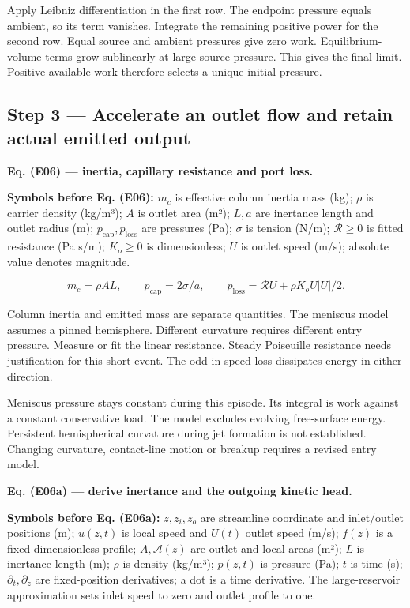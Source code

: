 \documentclass[11pt]{article}
\begin{document}
Apply Leibniz differentiation in the first row. The endpoint pressure equals ambient, so its term vanishes. Integrate the remaining positive power for the second row. Equal source and ambient pressures give zero work. Equilibrium-volume terms grow sublinearly at large source pressure. This gives the final limit. Positive available work therefore selects a unique initial pressure.



\subsection*{Step 3 — Accelerate an outlet flow and retain actual emitted output}

\textbf{Eq. (E06) — inertia, capillary resistance and port loss.}


\textbf{Symbols before Eq. (E06):} \(m_c\) is effective column inertia mass (kg); \(\rho\) is carrier density (kg/m³); \(A\) is outlet area (m²); \(L,a\) are inertance length and outlet radius (m); \(p_{\mathrm{cap}},p_{\mathrm{loss}}\) are pressures (Pa); \(\sigma\) is tension (N/m); \(\mathcal R\ge0\) is fitted resistance (Pa s/m); \(K_o\ge0\) is dimensionless; \(U\) is outlet speed (m/s); absolute value denotes magnitude.



\begin{equation*}
m_c=\rho AL,\qquad p_{\mathrm{cap}}=2\sigma/a,\qquad
p_{\mathrm{loss}}=\mathcal R U+\rho K_oU|U|/2.
\end{equation*}

Column inertia and emitted mass are separate quantities. The meniscus model assumes a pinned hemisphere. Different curvature requires different entry pressure. Measure or fit the linear resistance. Steady Poiseuille resistance needs justification for this short event. The odd-in-speed loss dissipates energy in either direction.


Meniscus pressure stays constant during this episode. Its integral is work against a constant conservative load. The model excludes evolving free-surface energy. Persistent hemispherical curvature during jet formation is not established. Changing curvature, contact-line motion or breakup requires a revised entry model.


\textbf{Eq. (E06a) — derive inertance and the outgoing kinetic head.}


\textbf{Symbols before Eq. (E06a):} \(z,z_i,z_o\) are streamline coordinate and inlet/outlet positions (m); \(u(z,t)\) is local speed and \(U(t)\) outlet speed (m/s); \(f(z)\) is a fixed dimensionless profile; \(A,\mathcal A(z)\) are outlet and local areas (m²); \(L\) is inertance length (m); \(\rho\) is density (kg/m³); \(p(z,t)\) is pressure (Pa); \(t\) is time (s); \(\partial_t,\partial_z\) are fixed-position derivatives; a dot is a time derivative. The large-reservoir approximation sets inlet speed to zero and outlet profile to one.
\end{document}
